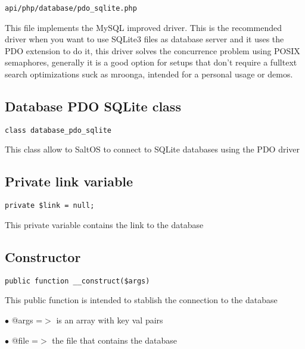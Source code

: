 \documentclass[a4paper]{book}
\begin{document}
\begin{lstlisting}
api/php/database/pdo_sqlite.php
\end{lstlisting}

This file implements the MySQL improved driver. This is the recommended driver when you want
to use SQLite3 files as database server and it uses the PDO extension to do it, this driver
solves the concurrence problem using POSIX semaphores, generally it is a good option for setups
that don't require a fulltext search optimizations suck as mroonga, intended for a personal
usage or demos.

\hypertarget{toc354}{}
\subsection{Database PDO SQLite class}

\begin{lstlisting}
class database_pdo_sqlite
\end{lstlisting}

This class allow to SaltOS to connect to SQLite databases using the PDO driver

\hypertarget{toc355}{}
\subsection{Private link variable}

\begin{lstlisting}
private $link = null;
\end{lstlisting}

This private variable contains the link to the database

\hypertarget{toc356}{}
\subsection{Constructor}

\begin{lstlisting}
public function __construct($args)
\end{lstlisting}

This public function is intended to stablish the connection to the database

\begin{compactitem}
\item[\color{myblue}$\bullet$] @args =$>$ is an array with key val pairs
\item[\color{myblue}$\bullet$] @file =$>$ the file that contains the database
\end{compactitem}
\end{document}

